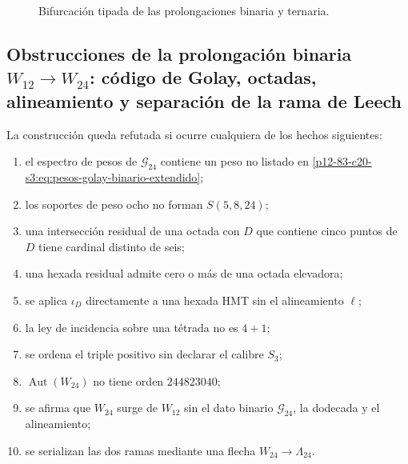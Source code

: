 \begin{figure}[htbp]
\centering
{}
\caption{Bifurcación tipada de las prolongaciones binaria y ternaria.}
\label{p12-83-c20-s3:fig:bifurcacion-w24-leech-autonoma}
\end{figure}

\subsection{Obstrucciones de la prolongación binaria \(W_{12}\to W_{24}\): código de Golay, octadas, alineamiento y separación de la rama de Leech}

\begin{criterion}
La construcción queda refutada si ocurre cualquiera de los hechos
siguientes:
\begin{enumerate}
 \item el espectro de pesos de \(\mathcal G_{24}\) contiene un peso no
       listado en \eqref{p12-83-c20-s3:eq:pesos-golay-binario-extendido};
 \item los soportes de peso ocho no forman \(S(5,8,24)\);
 \item una intersección residual de una octada con \(D\) que contiene cinco
       puntos de \(D\) tiene cardinal distinto de seis;
 \item una hexada residual admite cero o más de una octada elevadora;
 \item se aplica \(\iota_D\) directamente a una hexada HMT sin el
       alineamiento \(\ell\);
 \item la ley de incidencia sobre una tétrada no es \(4+1\);
 \item se ordena el triple positivo sin declarar el calibre \(S_3\);
 \item \(\operatorname{Aut}(W_{24})\) no tiene orden \(244823040\);
 \item se afirma que \(W_{24}\) surge de \(W_{12}\) sin el dato binario
       \(\mathcal G_{24}\), la dodecada y el alineamiento;
 \item se serializan las dos ramas mediante una flecha
       \(W_{24}\to\Lambda_{24}\).
\end{enumerate}
\end{criterion}


